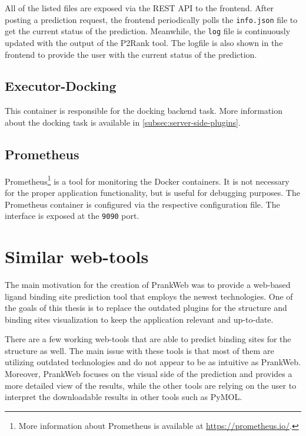All of the listed files are exposed via the REST API to the frontend. After posting a prediction request, the frontend periodically polls the \texttt{info.json} file to get the current status of the prediction. Meanwhile, the \texttt{log} file is continuously updated with the output of the P2Rank tool. The logfile is also shown in the frontend to provide the user with the current status of the prediction.

\subsection{Executor-Docking}
\label{subsec:executor-docking}

This container is responsible for the docking backend task. More information about the docking task is available in \cref{subsec:server-side-plugins}.

\subsection{Prometheus}
\label{subsec:prometheus}

Prometheus\footnote{More information about Prometheus is available at \url{https://prometheus.io/}.} is a tool for monitoring the Docker containers. It is not necessary for the proper application functionality, but is useful for debugging purposes. The Prometheus container is configured via the respective configuration file. The interface is exposed at the \texttt{9090} port.

\section{Similar web-tools}
\label{sec:similar_web_tools}

The main motivation for the creation of PrankWeb was to provide a web-based ligand binding site prediction tool that employs the newest technologies. One of the goals of this thesis is to replace the outdated plugins for the structure and binding sites visualization to keep the application relevant and up-to-date.

There are a few working web-tools that are able to predict binding sites for the structure as well. The main issue with these tools is that most of them are utilizing outdated technologies and do not appear to be as intuitive as PrankWeb\cite{jendele2019prankweb}. Moreover, PrankWeb focuses on the visual side of the prediction and provides a more detailed view of the results, while the other tools are relying on the user to interpret the downloadable results in other tools such as PyMOL.


